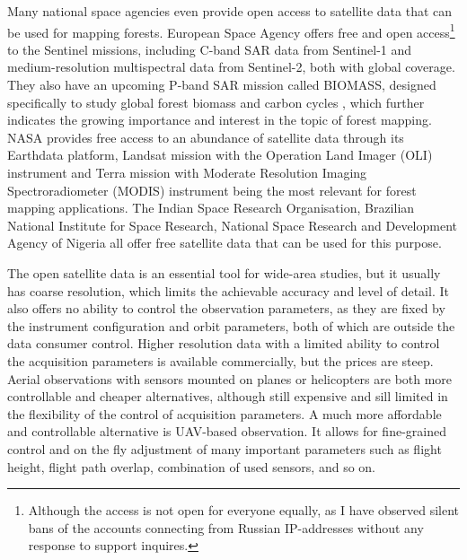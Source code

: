 Many national space agencies even provide open access to satellite data that can be used for mapping forests.
European Space Agency offers free and open access\footnote{Although the access is not open for everyone equally, as I have observed silent bans of the accounts connecting from Russian IP-addresses without any response to support inquires.} to the Sentinel missions, including C-band SAR data from Sentinel-1 and medium-resolution multispectral data from Sentinel-2, both with global coverage.
They also have an upcoming P-band SAR mission called BIOMASS, designed specifically to study global forest biomass and carbon cycles \citep{queganEuropeanSpaceAgency2019}, which further indicates the growing importance and interest in the topic of forest mapping.
NASA provides free access to an abundance of satellite data through its Earthdata platform, Landsat mission with the Operation Land Imager (OLI) instrument and Terra mission with Moderate Resolution Imaging Spectroradiometer (MODIS) instrument being the most relevant for forest mapping applications.
The Indian Space Research Organisation, Brazilian National Institute for Space Research, National Space Research and Development Agency of Nigeria all offer free satellite data that can be used for this purpose.

The open satellite data is an essential tool for wide-area studies, but it usually has coarse resolution, which limits the achievable accuracy and level of detail.
It also offers no ability to control the observation parameters, as they are fixed by the instrument configuration and orbit parameters, both of which are outside the data consumer control.
Higher resolution data with a limited ability to control the acquisition parameters is available commercially, but the prices are steep.
Aerial observations with sensors mounted on planes or helicopters are both more controllable and cheaper alternatives, although still expensive and sill limited in the flexibility of the control of acquisition parameters.
A much more affordable and controllable alternative is UAV-based observation.
It allows for fine-grained control and on the fly adjustment of many important parameters such as flight height, flight path overlap, combination of used sensors, and so on.

